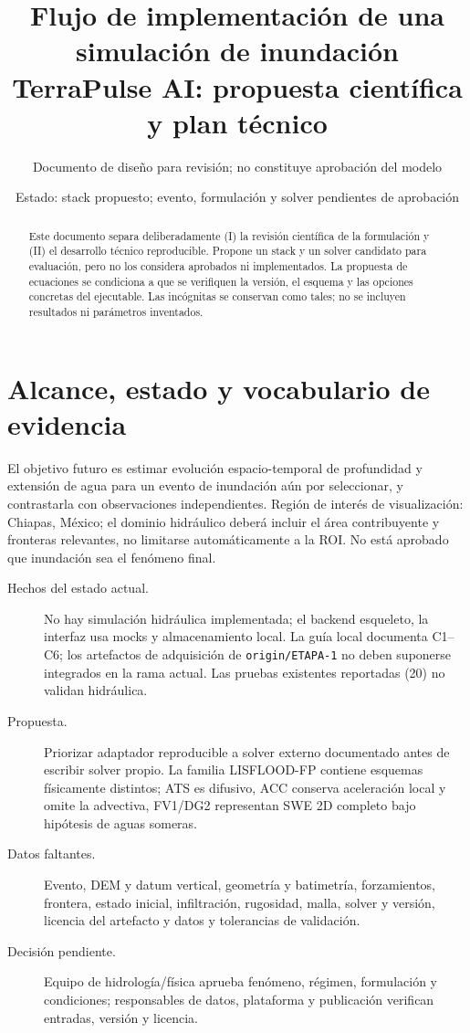 \documentclass[11pt,a4paper]{article}
\title{Flujo de implementación de una simulación de inundación\\\large TerraPulse AI: propuesta científica y plan técnico}
\author{Documento de diseño para revisión; no constituye aprobación del modelo}
\date{Estado: stack propuesto; evento, formulación y solver pendientes de aprobación}
\begin{document}
\maketitle
\begin{abstract}
Este documento separa deliberadamente (I) la revisión científica de la formulación y (II) el desarrollo técnico reproducible. Propone un stack y un solver candidato para evaluación, pero no los considera aprobados ni implementados. La propuesta de ecuaciones se condiciona a que se verifiquen la versión, el esquema y las opciones concretas del ejecutable. Las incógnitas se conservan como tales; no se incluyen resultados ni parámetros inventados.
\end{abstract}
\tableofcontents\newpage

\section{Alcance, estado y vocabulario de evidencia}
El objetivo futuro es estimar evolución espacio-temporal de profundidad y extensión de agua para un evento de inundación aún por seleccionar, y contrastarla con observaciones independientes. Región de interés de visualización: Chiapas, México; el dominio hidráulico deberá incluir el área contribuyente y fronteras relevantes, no limitarse automáticamente a la ROI. No está aprobado que inundación sea el fenómeno final.

\begin{description}
\item[Hechos del estado actual.] No hay simulación hidráulica implementada; el backend esqueleto, la interfaz usa mocks y almacenamiento local. La guía local documenta C1--C6; los artefactos de adquisición de \texttt{origin/ETAPA-1} no deben suponerse integrados en la rama actual. Las pruebas existentes reportadas (20) no validan hidráulica.
\item[Propuesta.] Priorizar adaptador reproducible a solver externo documentado antes de escribir solver propio. La familia LISFLOOD-FP contiene esquemas físicamente distintos; ATS es difusivo, ACC conserva aceleración local y omite la advectiva, FV1/DG2 representan SWE 2D completo bajo hipótesis de aguas someras.
\item[Datos faltantes.] Evento, DEM y datum vertical, geometría y batimetría, forzamientos, frontera, estado inicial, infiltración, rugosidad, malla, solver y versión, licencia del artefacto y datos y tolerancias de validación.
\item[Decisión pendiente.] Equipo de hidrología/física aprueba fenómeno, régimen, formulación y condiciones; responsables de datos, plataforma y publicación verifican entradas, versión y licencia.
\end{description}
\end{document}
